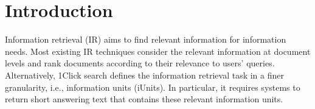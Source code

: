 \section{Introduction}

Information retrieval (IR) aims to find relevant information for information needs.
Most existing IR techniques consider the relevant information at document levels and rank documents according to their relevance to users' queries.
Alternatively, 1Click search defines the information retrieval task in a finer granularity, i.e., information units (iUnits).
In particular, it requires systems to return short answering text that contains these relevant information units.






